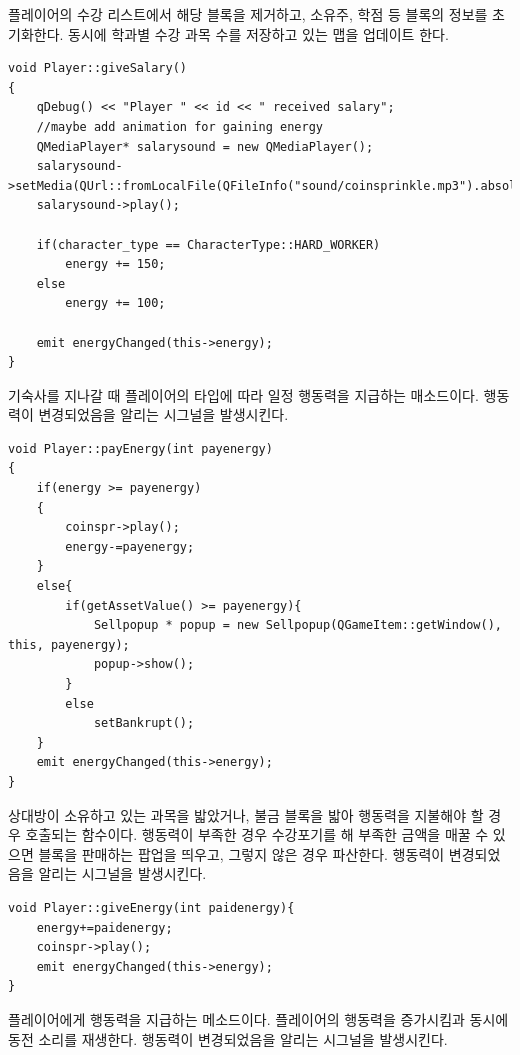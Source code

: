 \documentclass[10pt,oneside,a4paper,titlepage]{article}
\begin{document}
플레이어의 수강 리스트에서 해당 블록을 제거하고, 소유주, 학점 등 블록의 정보를 초기화한다. 동시에 학과별 수강 과목 수를 저장하고 있는 맵을 업데이트 한다.\\

\begin{lstlisting}
void Player::giveSalary()
{
    qDebug() << "Player " << id << " received salary";
    //maybe add animation for gaining energy
    QMediaPlayer* salarysound = new QMediaPlayer();
    salarysound->setMedia(QUrl::fromLocalFile(QFileInfo("sound/coinsprinkle.mp3").absoluteFilePath()));
    salarysound->play();

    if(character_type == CharacterType::HARD_WORKER)
        energy += 150;
    else
        energy += 100;

    emit energyChanged(this->energy);
}
\end{lstlisting}

기숙사를 지나갈 때 플레이어의 타입에 따라 일정 행동력을 지급하는 매소드이다. 행동력이 변경되었음을 알리는 시그널을 발생시킨다.\\


\begin{lstlisting}
void Player::payEnergy(int payenergy)
{
    if(energy >= payenergy)
    {
        coinspr->play();
        energy-=payenergy;
    }
    else{
        if(getAssetValue() >= payenergy){
            Sellpopup * popup = new Sellpopup(QGameItem::getWindow(), this, payenergy);
            popup->show();
        }
        else
            setBankrupt();
    }
    emit energyChanged(this->energy);
}
\end{lstlisting}

상대방이 소유하고 있는 과목을 밟았거나, 불금 블록을 밟아 행동력을 지불해야 할 경우 호출되는 함수이다. 행동력이 부족한 경우 수강포기를 해 부족한 금액을 매꿀 수 있으면 블록을 판매하는 팝업을 띄우고, 그렇지 않은 경우 파산한다. 행동력이 변경되었음을 알리는 시그널을 발생시킨다. \\


\begin{lstlisting}
void Player::giveEnergy(int paidenergy){
    energy+=paidenergy;
    coinspr->play();
    emit energyChanged(this->energy);
}
\end{lstlisting}

플레이어에게 행동력을 지급하는 메소드이다. 플레이어의 행동력을 증가시킴과 동시에 동전 소리를 재생한다. 행동력이 변경되었음을 알리는 시그널을 발생시킨다. \\
\end{document}
